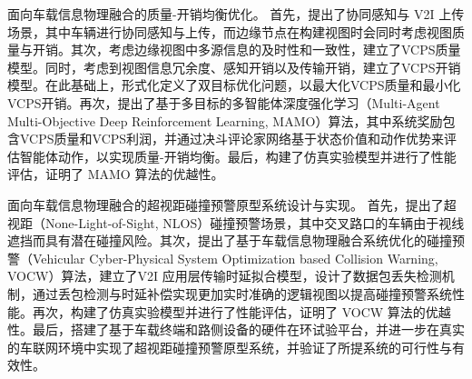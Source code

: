 \begin{cabstract}
 面向车载信息物理融合的质量-开销均衡优化。
首先，提出了协同感知与 V2I 上传场景，其中车辆进行协同感知与上传，而边缘节点在构建视图时会同时考虑视图质量与开销。其次，考虑边缘视图中多源信息的及时性和一致性，建立了VCPS质量模型。同时，考虑到视图信息冗余度、感知开销以及传输开销，建立了VCPS开销模型。在此基础上，形式化定义了双目标优化问题，以最大化VCPS质量和最小化VCPS开销。再次，提出了基于多目标的多智能体深度强化学习（Multi-Agent Multi-Objective Deep Reinforcement Learning, MAMO）算法，其中系统奖励包含VCPS质量和VCPS利润，并通过决斗评论家网络基于状态价值和动作优势来评估智能体动作，以实现质量-开销均衡。最后，构建了仿真实验模型并进行了性能评估，证明了 MAMO 算法的优越性。

 面向车载信息物理融合的超视距碰撞预警原型系统设计与实现。
首先，提出了超视距（None-Light-of-Sight, NLOS）碰撞预警场景，其中交叉路口的车辆由于视线遮挡而具有潜在碰撞风险。其次，提出了基于车载信息物理融合系统优化的碰撞预警（Vehicular Cyber-Physical System Optimization based Collision Warning, VOCW）算法，建立了V2I 应用层传输时延拟合模型，设计了数据包丢失检测机制，通过丢包检测与时延补偿实现更加实时准确的逻辑视图以提高碰撞预警系统性能。再次，构建了仿真实验模型并进行了性能评估，证明了 VOCW 算法的优越性。最后，搭建了基于车载终端和路侧设备的硬件在环试验平台，并进一步在真实的车联网环境中实现了超视距碰撞预警原型系统，并验证了所提系统的可行性与有效性。

\end{cabstract}

